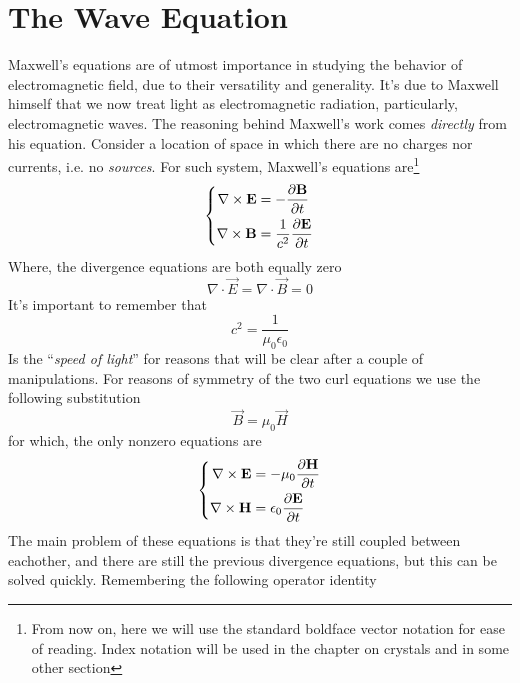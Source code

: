 \documentclass[../electromagnetism.tex]{subfiles}
\begin{document}
\section{The Wave Equation}
Maxwell's equations are of utmost importance in studying the behavior of electromagnetic field, due to their versatility and generality. It's due to Maxwell himself that we now treat light as electromagnetic radiation, particularly, electromagnetic waves.
The reasoning behind Maxwell's work comes \textit{directly} from his equation. Consider a location of space in which there are no charges nor currents, i.e. no \textit{sources}. For such system, Maxwell's equations are\footnote{From now on, here we will use the standard boldface vector notation for ease of reading. Index notation will be used in the chapter on crystals and in some other section}
\begin{equation}
	\left\{ \begin{aligned}
			\nabla\times\mathbf{E}&=-\pdv{\mathbf{B}}{t}\\
			\nabla\times\mathbf{B}&=\frac{1}{c^2}\pdv{\mathbf{E}}{t}
	\end{aligned}\right.
	\label{eq:mweq.waves}
\end{equation}
Where, the divergence equations are both equally zero
\begin{equation}
	\nabla\cdot\vec{E}=\nabla\cdot\vec{B}=0
	\label{eq:diveq.waves}
\end{equation}
It's important to remember that 
\begin{equation*}
	c^2=\frac{1}{\mu_0\epsilon_0}
\end{equation*}
Is the ``\textit{speed of light}'' for reasons that will be clear after a couple of manipulations. For reasons of symmetry of the two curl equations we use the following substitution
\begin{equation}
	\vec{B}=\mu_0\vec{H}
	\label{eq:btoh.waves}
\end{equation}
for which, the only nonzero equations are
\begin{equation}
	\left\{\begin{aligned}
		\nabla\times\mathbf{E}&=-\mu_0\pdv{\mathbf{H}}{t}\\
		\nabla\times\mathbf{H}&=\epsilon_0\pdv{\mathbf{E}}{t}
	\end{aligned}\right.
	\label{eq:nonzeromwe.waves}
\end{equation}
The main problem of these equations is that they're still coupled between eachother, and there are still the previous divergence equations, but this can be solved quickly. Remembering the following operator identity
\end{document}
